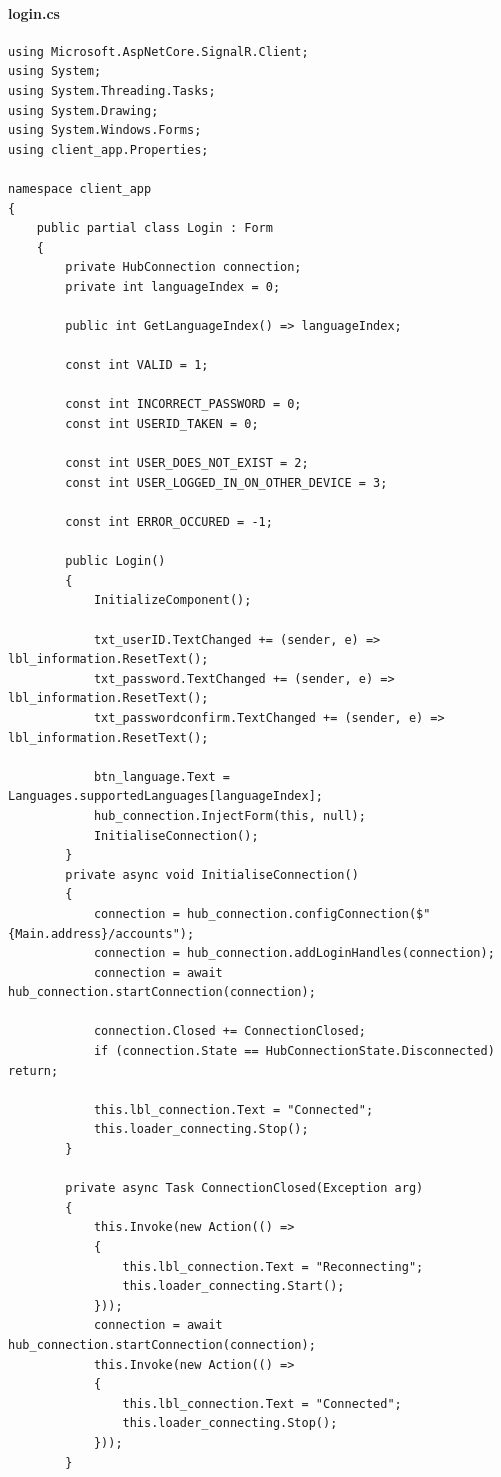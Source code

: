 \documentclass{article}
\begin{document}
\paragraph{login.cs}\label{client/login.cs}
\begin{verbatim}
using Microsoft.AspNetCore.SignalR.Client;
using System;
using System.Threading.Tasks;
using System.Drawing;
using System.Windows.Forms;
using client_app.Properties;

namespace client_app
{
	public partial class Login : Form
	{
		private HubConnection connection;
		private int languageIndex = 0;

		public int GetLanguageIndex() => languageIndex;

		const int VALID = 1;

		const int INCORRECT_PASSWORD = 0;
		const int USERID_TAKEN = 0;

		const int USER_DOES_NOT_EXIST = 2;
		const int USER_LOGGED_IN_ON_OTHER_DEVICE = 3;

		const int ERROR_OCCURED = -1;

		public Login()
		{
			InitializeComponent();

			txt_userID.TextChanged += (sender, e) => lbl_information.ResetText();
			txt_password.TextChanged += (sender, e) => lbl_information.ResetText();
			txt_passwordconfirm.TextChanged += (sender, e) => lbl_information.ResetText();

			btn_language.Text = Languages.supportedLanguages[languageIndex];
			hub_connection.InjectForm(this, null);
			InitialiseConnection();
		}
		private async void InitialiseConnection()
		{
			connection = hub_connection.configConnection($"{Main.address}/accounts");
			connection = hub_connection.addLoginHandles(connection);
			connection = await hub_connection.startConnection(connection);

			connection.Closed += ConnectionClosed;
			if (connection.State == HubConnectionState.Disconnected) return;

			this.lbl_connection.Text = "Connected";
			this.loader_connecting.Stop();
		}

		private async Task ConnectionClosed(Exception arg)
		{
			this.Invoke(new Action(() =>
			{
				this.lbl_connection.Text = "Reconnecting";
				this.loader_connecting.Start();
			}));
			connection = await hub_connection.startConnection(connection);
			this.Invoke(new Action(() =>
			{
				this.lbl_connection.Text = "Connected";
				this.loader_connecting.Stop();
			}));
		}


\end{verbatim}
\end{document}
